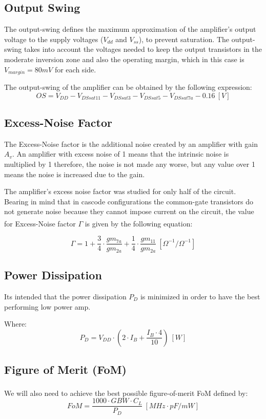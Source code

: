 \subsection{Output Swing}
The output-swing defines the maximum approximation of the amplifier's output voltage to the supply voltages ($V_{dd}$ and $V_{ss}$), to prevent saturation. The output-swing takes into account the voltages needed to keep the output transistors in the moderate inversion zone and also the operating margin, which in this case is $V_{margin}=80mV$ for each side.

The output-swing of the amplifier can be obtained by the following expression:
\begin{equation}
    OS = V_{DD} - V_{DSsat11} - V_{DSsat3} - V_{DSsat5} - V_{DSsat7a} - 0.16 \ [V]
    \label{eq:OS}
\end{equation}

\subsection{Excess-Noise Factor}
The Excess-Noise factor is the additional noise created by an amplifier with gain $A_v$. An amplifier with excess noise of 1 means that the intrinsic noise is multiplied by 1 therefore, the noise is not made any worse, but any value over 1 means the noise is increased due to the gain.

The amplifier's excess noise factor was studied for only half of the circuit. Bearing in mind that in cascode configurations the common-gate transistors do not generate noise because they cannot impose current on the circuit, the value for Excess-Noise factor $\Gamma$ is given by the following equation\textsuperscript{\cite{artigo-prof}}:

\begin{equation}
    \Gamma = 1 + \frac{3}{4}\cdot \frac{gm_{7a}}{gm_{2a}} + \frac{1}{4}\cdot \frac{gm_{11}}{gm_{2a}} \ [\Omega ^{-1} / \Omega ^{-1}]
    \label{eq:ENF}
\end{equation}


\subsection{Power Dissipation}

Its intended that the power dissipation $P_D$ is minimized in order to have the best performing low power amp.

Where: 
\begin{equation}
    P_D = V_{DD} \cdot \left(2 \cdot I_B + \dfrac{I_B\cdot 4}{10}\right) \ [W]
    \label{eq:PD}
\end{equation}

\subsection{Figure of Merit (FoM)}
 We will also need to achieve the best possible figure-of-merit FoM defined by\textsuperscript{\cite{Lab-statement}}: 
\begin{equation}
    FoM = \frac{1000 \cdot GBW \cdot C_L}{P_D} \ [MHz \cdot pF/mW]
    \label{eq:FoM}
\end{equation}
